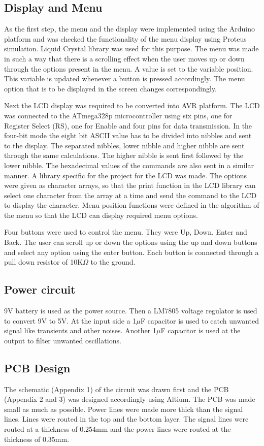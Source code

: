 \documentclass[11pt]{article}
\begin{document}
\subsection{Display and Menu}
As the first step, the menu and the display were implemented using the Arduino platform and was checked the functionality of the menu display using Proteus simulation. Liquid Crystal library was used for this purpose. The menu was made in such a way that there is a scrolling effect when the user moves up or down through the options present in the menu. A value is set to the variable position. This variable is updated whenever a button is pressed accordingly. The menu option that is to be displayed in the screen changes correspondingly.

Next the LCD display was required to be converted into AVR platform. The LCD was connected to the ATmega328p microcontroller using six pins, one for Register Select (RS), one for Enable and four pins for data transmission. In the four-bit mode the eight bit ASCII value has to be divided into nibbles and sent to the display. The separated nibbles, lower nibble and higher nibble are sent through the same calculations. The higher nibble is sent first followed by the lower nibble. The hexadecimal values of the commands are also sent in a similar manner. A library specific for the  project for the LCD was made. The options were given as character arrays, so that the print function in the LCD library can select one character from the array at a time and send the command to the LCD to display the character. Menu position functions were defined in the algorithm of the menu so that the LCD can display required menu options. 

Four buttons were used to control the menu. They were Up, Down, Enter and Back. The  user can scroll up or down the options using the up and down buttons and select any option using the enter button.  Each button is connected through a pull down resistor of 10K$\Omega$ to the ground.


\subsection{Power circuit}
9V battery is used as the power source. Then a LM7805 voltage regulator is used to convert 9V to 5V. At the input side a 1$\mu$F capacitor is used to catch unwanted signal like transients and other noises. Another 1$\mu$F capacitor is used at the output to filter unwanted oscillations. 

\subsection{PCB Design}
The schematic (Appendix 1) of the circuit was drawn first and the PCB (Appendix 2 and 3) was designed accordingly using Altium. The PCB was made small as much as possible. Power lines were made more thick than the signal lines. Lines were routed in the top and the bottom layer. The signal lines were routed at a thickness of 0.254mm and the power lines were routed at the thickness of 0.35mm. 
\end{document}
